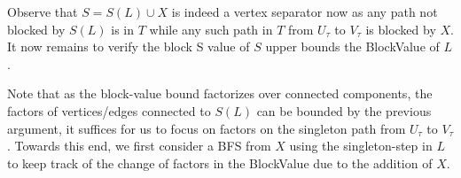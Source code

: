 \documentclass[10pt,a4paper]{article}
\begin{document}
Observe that $S=S(L)\cup X$ is indeed a vertex separator now as any path not blocked by $S(L)$ is in $T$ while any such path in $T$ from $U_{\tau}$ to $V_{\tau}$ is blocked by $X$. It now remains to verify the block S value of $S$ upper bounds the BlockValue of $L$.\par




Note that as the block-value bound factorizes over connected components, the factors of vertices/edges connected to $S(L)$ can be bounded by the previous argument, it suffices for us to focus on factors on the singleton path from $U_{\tau}$ to $V_{\tau}$.
Towards this end, we first consider a BFS from $X$ using the singleton-step in $L$ to keep track of the change of factors in the BlockValue due to the addition of $X$.\par
\end{document}
